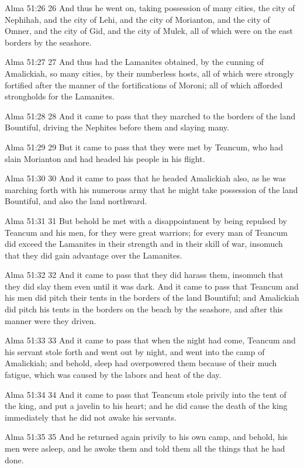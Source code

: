 Alma 51:26
 26 And thus he went on, taking possession of many cities, the
city of Nephihah, and the city of Lehi, and the city of
Morianton, and the city of Omner, and the city of Gid, and the
city of Mulek, all of which were on the east borders by the
seashore.

Alma 51:27
 27 And thus had the Lamanites obtained, by the cunning of
Amalickiah, so many cities, by their numberless hosts, all of
which were strongly fortified after the manner of the
fortifications of Moroni; all of which afforded strongholds for
the Lamanites.

Alma 51:28
 28 And it came to pass that they marched to the borders of the
land Bountiful, driving the Nephites before them and slaying
many.

Alma 51:29
 29 But it came to pass that they were met by Teancum, who had
slain Morianton and had headed his people in his flight.

Alma 51:30
 30 And it came to pass that he headed Amalickiah also, as he was
marching forth with his numerous army that he might take
possession of the land Bountiful, and also the land northward.

Alma 51:31
 31 But behold he met with a disappointment by being repulsed by
Teancum and his men, for they were great warriors; for every man
of Teancum did exceed the Lamanites in their strength and in
their skill of war, insomuch that they did gain advantage over
the Lamanites.

Alma 51:32
 32 And it came to pass that they did harass them, insomuch that
they did slay them even until it was dark. And it came to pass
that Teancum and his men did pitch their tents in the borders of
the land Bountiful; and Amalickiah did pitch his tents in the
borders on the beach by the seashore, and after this manner were
they driven.

Alma 51:33
 33 And it came to pass that when the night had come, Teancum and
his servant stole forth and went out by night, and went into the
camp of Amalickiah; and behold, sleep had overpowered them
because of their much fatigue, which was caused by the labors and
heat of the day.

Alma 51:34
 34 And it came to pass that Teancum stole privily into the tent
of the king, and put a javelin to his heart; and he did cause the
death of the king immediately that he did not awake his servants.

Alma 51:35
 35 And he returned again privily to his own camp, and behold,
his men were asleep, and he awoke them and told them all the
things that he had done.

